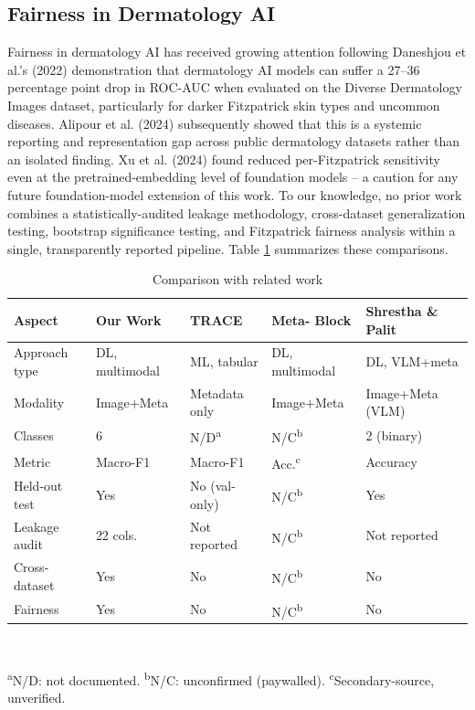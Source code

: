 \documentclass[conference]{IEEEtran}
\begin{document}
\subsection{Fairness in Dermatology AI}
Fairness in dermatology AI has received growing attention following Daneshjou et al.'s (2022) demonstration that dermatology AI models can suffer a 27--36 percentage point drop in ROC-AUC when evaluated on the Diverse Dermatology Images dataset, particularly for darker Fitzpatrick skin types and uncommon diseases. Alipour et al. (2024) subsequently showed that this is a systemic reporting and representation gap across public dermatology datasets rather than an isolated finding. Xu et al. (2024) found reduced per-Fitzpatrick sensitivity even at the pretrained-embedding level of foundation models -- a caution for any future foundation-model extension of this work. To our knowledge, no prior work combines a statistically-audited leakage methodology, cross-dataset generalization testing, bootstrap significance testing, and Fitzpatrick fairness analysis within a single, transparently reported pipeline. Table \ref{tab:litcompare} summarizes these comparisons.

\begin{table}[t]
\caption{Comparison with related work}
\label{tab:litcompare}
\centering
\scriptsize
\begin{tabular}{|p{1.3cm}|p{1.1cm}|p{1.1cm}|p{1.15cm}|p{1.15cm}|}
\hline
\textbf{Aspect} & \textbf{Our Work} & \textbf{TRACE} & \textbf{Meta- Block} & \textbf{Shrestha \& Palit} \\
\hline
Approach type & DL, multimodal & ML, tabular & DL, multimodal & DL, VLM+meta \\
\hline
Modality & Image+Meta & Metadata only & Image+Meta & Image+Meta (VLM) \\
\hline
Classes & 6 & N/D\textsuperscript{a} & N/C\textsuperscript{b} & 2 (binary) \\
\hline
Metric & Macro-F1 & Macro-F1 & Acc.\textsuperscript{c} & Accuracy \\
\hline
Held-out test & Yes & No (val-only) & N/C\textsuperscript{b} & Yes \\
\hline
Leakage audit & 22 cols. & Not reported & N/C\textsuperscript{b} & Not reported \\
\hline
Cross-dataset & Yes & No & N/C\textsuperscript{b} & No \\
\hline
Fairness & Yes & No & N/C\textsuperscript{b} & No \\
\hline
\end{tabular}
\\[2pt]
\raggedright{\scriptsize \textsuperscript{a}N/D: not documented. \textsuperscript{b}N/C: unconfirmed (paywalled). \textsuperscript{c}Secondary-source, unverified.}
\end{table}
\end{document}
